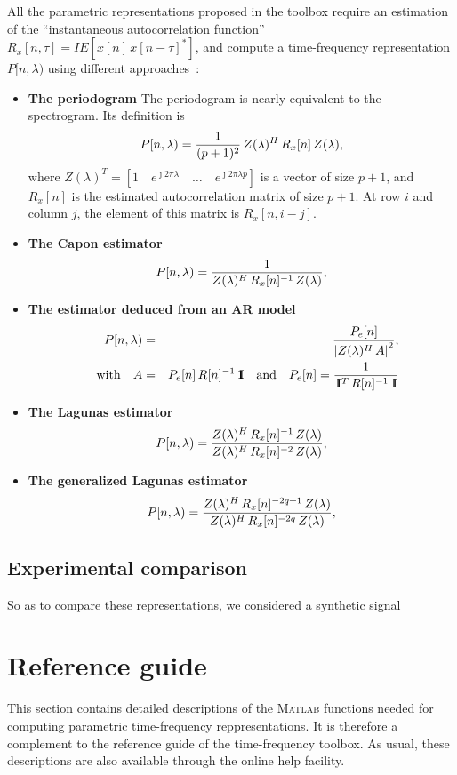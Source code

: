 \documentclass[12pt,a4paper]{report}
\newcommand{\esp}[1]{I\!\!E\left[{#1}\right]}
\newcommand{\un}{1\!\!{\rm I}}
\begin{document}
All the parametric representations proposed in the toolbox
require an estimation of the ``instantaneous autocorrelation function''
$R_x[n,\tau]=\esp{x[n]\,x[n-\tau]^*}$, and compute a time-frequency representation
$P[n,\lambda)$ using different approaches~:
\begin{itemize}
\item\textbf{The periodogram}
The periodogram is nearly equivalent to the spectrogram. Its definition is
$$
P[n,\lambda)={1\over(p+1)^2}\,Z(\lambda)^H\,R_x[n]\,Z(\lambda),
$$
where $Z(\lambda)^T=\left[{1\quad e^{\jmath2\pi\lambda}\quad\ldots\quad e^{\jmath2\pi\lambda p}}\right]$
is a vector of size $p+1$, and $R_x[n]$ is the estimated autocorrelation matrix of size $p+1$.
At row $i$ and column $j$, the element of this matrix is $R_x[n,i-j]$.

\item\textbf{The Capon estimator} 
$$
P[n,\lambda)={1\over Z(\lambda)^H\,R_x[n]^{-1}\,Z(\lambda)},
$$

\item\textbf{The estimator deduced from an AR model}
\begin{eqnarray*}
P[n,\lambda)&=&{P_e[n]\over \left|{Z(\lambda)^H\,A}\right|^2},\\
\quad{\rm with}\quad
A&=&P_e[n]\,R[n]^{-1}\,\un
\quad{\rm and}\quad
P_e[n]={1\over \un^T\,R[n]^{-1}\,\un}
\end{eqnarray*}

\item\textbf{The Lagunas estimator}
$$
P[n,\lambda)={Z(\lambda)^H\,R_x[n]^{-1}\,Z(\lambda)\over 
              Z(\lambda)^H\,R_x[n]^{-2}\,Z(\lambda)},
$$

\item\textbf{The generalized Lagunas estimator}
$$
P[n,\lambda)={Z(\lambda)^H\,R_x[n]^{-2q+1}\,Z(\lambda)\over 
              Z(\lambda)^H\,R_x[n]^{-2q}\,Z(\lambda)},
$$

\end{itemize}
\section{Experimental comparison}
So as to compare these representations, we considered a synthetic signal
\chapter{Reference guide}

This section contains detailed descriptions of the M\textsc{atlab} functions 
needed for computing parametric time-frequency reppresentations. It is therefore 
a complement to the reference guide of the time-frequency toolbox. As usual,
these descriptions are also available through the online help facility.
\end{document}
